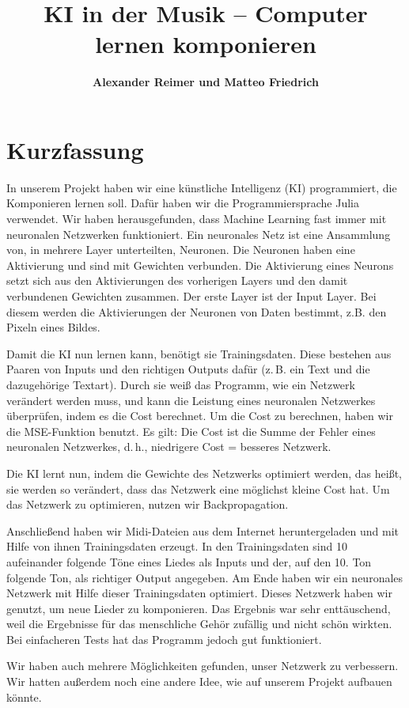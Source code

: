 \documentclass[11pt, a4paper, ngerman]{article}
\title{\textbf{\Huge KI in der Musik – Computer lernen komponieren}}
\date{}
\author[]{\textbf{\LARGE Alexander Reimer und Matteo Friedrich}}
\affil[]{\textbf{\huge Gymnasium Eversten Oldenburg} \\ \vspace{10mm} \textbf{\Large Betreuer: Herr Dr. Glade \& Herr Husemeyer}}
\begin{document}
\setcounter{figure}{1}
\maketitle
\newpage
\tableofcontents
\newpage
\section{Kurzfassung}
In unserem Projekt haben wir eine künstliche Intelligenz (KI) programmiert, die Komponieren lernen soll. Dafür haben wir die Programmiersprache Julia verwendet. Wir haben herausgefunden, dass Machine Learning fast immer mit neuronalen Netzwerken funktioniert. Ein neuronales Netz ist eine Ansammlung von, in mehrere Layer unterteilten, Neuronen. Die Neuronen haben eine Aktivierung und sind mit Gewichten verbunden. Die Aktivierung eines Neurons setzt sich aus den Aktivierungen des vorherigen Layers und den damit verbundenen Gewichten zusammen. Der erste Layer ist der Input Layer. Bei diesem werden die Aktivierungen der Neuronen von Daten bestimmt, z.B. den Pixeln eines Bildes.

Damit die KI nun lernen kann, benötigt sie Trainingsdaten. Diese bestehen aus Paaren von Inputs und den richtigen Outputs dafür (z.\,B. ein Text und die dazugehörige Textart). Durch sie weiß das Programm, wie ein Netzwerk verändert werden muss, und kann die Leistung eines neuronalen Netzwerkes überprüfen, indem es die Cost berechnet. Um die Cost zu berechnen, haben wir die MSE-Funktion benutzt. Es gilt: Die Cost ist die Summe der Fehler eines neuronalen Netzwerkes, d.\,h., niedrigere Cost = besseres Netzwerk.

Die KI lernt nun, indem die Gewichte des Netzwerks optimiert werden, das heißt, sie werden so verändert, dass das Netzwerk eine möglichst kleine Cost hat. Um das Netzwerk zu optimieren, nutzen wir Backpropagation.

Anschließend haben wir Midi-Dateien aus dem Internet heruntergeladen und mit Hilfe von ihnen Trainingsdaten erzeugt. In den Trainingsdaten sind 10 aufeinander folgende Töne eines Liedes als Inputs und der, auf den 10. Ton folgende Ton, als richtiger Output angegeben.
Am Ende haben wir ein neuronales Netzwerk mit Hilfe dieser Trainingsdaten optimiert. Dieses Netzwerk haben wir genutzt, um neue Lieder zu komponieren. Das Ergebnis war sehr enttäuschend, weil die Ergebnisse für das menschliche Gehör zufällig und nicht schön wirkten. Bei einfacheren Tests hat das Programm jedoch gut funktioniert.

Wir haben auch mehrere Möglichkeiten gefunden, unser Netzwerk zu verbessern. Wir hatten außerdem noch eine andere Idee, wie auf unserem Projekt aufbauen könnte.
\newpage
\end{document}
